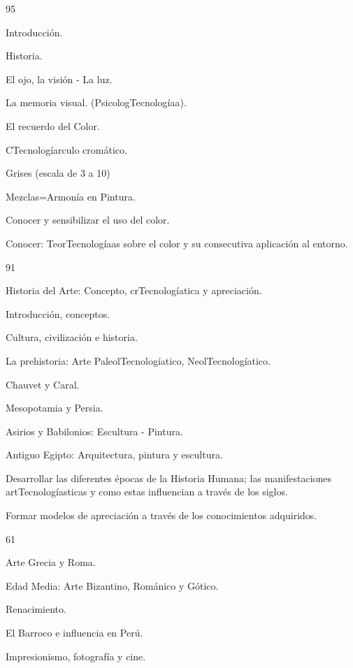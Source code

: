 \begin{syllabus}
\begin{unit}{}{}{9}{5}
\begin{topics}
	\item Introducción.
	\item Historia.
	\item El ojo, la visión - La luz.
	\item La memoria visual. (PsicologTecnologíaa).
	\item El recuerdo del Color.
	\item CTecnologíarculo cromático.
	\item Grises (escala de 3 a 10)
	\item Mezclas=Armonía en Pintura.
\end{topics}
\begin{learningoutcomes}
	\item Conocer y sensibilizar el uso del color.
	\item Conocer: TeorTecnologíaas sobre el color y su consecutiva aplicación al entorno.
\end{learningoutcomes}
\end{unit}

\begin{unit}{}{}{9}{1}
\begin{topics}
	\item Historia del Arte: Concepto, crTecnologíatica y apreciación.
	\item Introducción, conceptos.
	\item Cultura, civilización e historia.
	\item La prehistoria: Arte PaleolTecnologíatico, NeolTecnologíatico.
	\item Chauvet y Caral.
	\item Mesopotamia y Persia.
	\item Asirios y Babilonios: Escultura - Pintura.
	\item Antiguo Egipto: Arquitectura, pintura y escultura.
\end{topics}
\begin{learningoutcomes}
	\item Desarrollar las diferentes épocas de la Historia Humana; las manifestaciones artTecnologíasticas y como estas influencian a través de los siglos.
	\item Formar modelos de apreciación a través de los conocimientos adquiridos.
\end{learningoutcomes}
\end{unit}

\begin{unit}{}{}{6}{1}
\begin{topics}
	\item Arte Grecia y Roma.
	\item Edad Media: Arte Bizantino, Románico y Gótico.
	\item Renacimiento.
	\item El Barroco e influencia en Perú.
	\item Impresionismo, fotografía y cine.
\end{topics}


\end{unit}
\end{syllabus}
